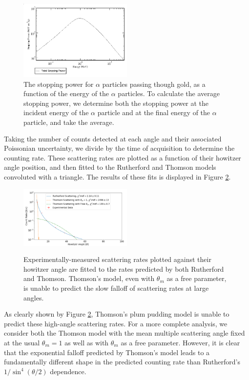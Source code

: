    \begin{figure}[h]
     \includegraphics[width=0.5\textwidth]{nist.png}
     \caption{The stopping power for $\alpha$ particles passing though gold, as a function of the energy of the $\alpha$ particles. To calculate the average stopping power, we determine both the stopping power at the incident energy of the $\alpha$ particle and at the final energy of the $\alpha$ particle, and take the average.}
     \label{stop}
   \end{figure}

Taking the number of counts detected at each angle and their associated Poissonian uncertainty, we divide by the time of acquisition to determine the counting rate. These scattering rates are plotted as a function of their howitzer angle position, and then fitted to the Rutherford and Thomson models convoluted with a triangle. The results of these fits is displayed in Figure \ref{final-plot}.

\begin{figure}[h]
  \includegraphics[width=0.5\textwidth]{plot-error.png}
  \label{final-plot}
  \caption{Experimentally-measured scattering rates plotted against their howitzer angle are fitted to the rates predicted by both Rutherford and Thomson. Thomson's model, even with $\theta_m$ as a free parameter, is unable to predict the slow falloff of scattering rates at large angles.}
\end{figure}
As clearly shown by Figure \ref{final-plot}, Thomson's plum pudding model is unable to predict these high-angle scattering rates. For a more complete analysis, we consider both the Thomson model with the mean multiple scattering angle fixed at the usual $\theta_m = 1$ as well as with $\theta_m$ as a free parameter. However, it is clear that the exponential falloff predicted by Thomson's model leads to a fundamentally different shape in the predicted counting rate than Rutherford's $1/\sin^4(\theta/2)$ dependence.

